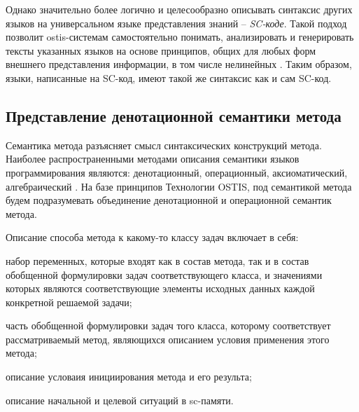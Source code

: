 Однако значительно более логично и целесообразно описывать синтаксис других языков на универсальном языке представления знаний -- \textit{SC-коде}. Такой подход позволит ostis-системам самостоятельно понимать, анализировать и генерировать тексты указанных языков на основе принципов, общих для любых форм внешнего представления информации, в том числе нелинейных \cite{Petrov1978}. Таким образом, языки, написанные на SC-код, имеют такой же синтаксис как и сам SC-код.

\subsection{Представление денотационной семантики метода}
\label{sec_programs_method_den_semantic}

Семантика метода разъясняет смысл синтаксических конструкций метода. Наиболее распространенными методами описания семантики языков программирования являются: денотационный, операционный, аксиоматический, алгебраический \cite{Orlov2013}. На базе принципов Технологии OSTIS, под семантикой метода будем подразумевать объединение денотационной и операционной семантик метода.

Описание способа  метода к какому-то классу задач включает в себя:
\begin{textitemize}
    \item набор переменных, которые входят как в состав метода, так и в состав обобщенной формулировки задач соответствующего класса, и значениями которых являются соответствующие элементы исходных данных каждой конкретной решаемой задачи;
    \item часть обобщенной формулировки задач того класса, которому соответствует рассматриваемый метод, являющихся описанием условия применения этого метода;
    \item описание условаия инициирования метода и его результа;
    \item описание начальной и целевой ситуаций в sc-памяти.
\end{textitemize}

